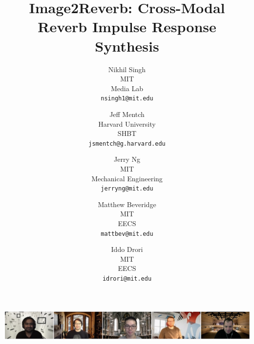 \documentclass[10pt,twocolumn,letterpaper]{article}
\begin{document}
\title{Image2Reverb: Cross-Modal Reverb Impulse Response Synthesis}

\author{Nikhil Singh\\
MIT\\
Media Lab\\
{\tt\small nsingh1@mit.edu}
\and
Jeff Mentch\\
Harvard University\\
SHBT\\
{\tt\small jsmentch@g.harvard.edu}
\and
Jerry Ng\\
MIT\\
Mechanical Engineering\\
{\tt\small jerryng@mit.edu}
\and
Matthew Beveridge\\
MIT\\
EECS\\
{\tt\small mattbev@mit.edu}
\and
Iddo Drori\\
MIT\\
EECS\\
{\tt\small idrori@mit.edu}
}

\maketitle
\ificcvfinal\thispagestyle{empty}\fi

\begin{strip}
    \centering
    \includegraphics[width=\textwidth]{teaser-clean.png}
    \label{fig:t}
\end{strip}

\ificcvfinal\thispagestyle{empty}\fi
\end{document}

